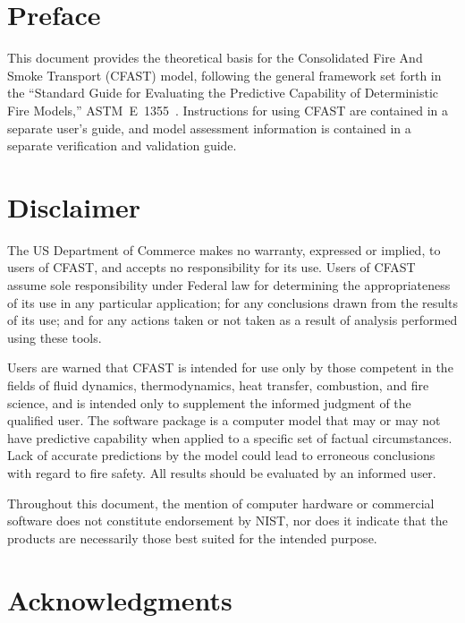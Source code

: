 \documentclass[12pt]{book}
\begin{document}
\newpage

\frontmatter

\pagestyle{plain}
\setcounter{page}{3}


\chapter{Preface}

This document provides the theoretical basis for the Consolidated Fire And Smoke Transport (CFAST) model, following the general framework set forth in the ``Standard Guide for Evaluating the Predictive Capability of Deterministic Fire Models,'' ASTM~E~1355~\cite{ASTM:E1355}. Instructions for using CFAST are contained in a separate user's guide, and model assessment information is contained in a separate verification and validation guide.

\chapter{Disclaimer}

The US Department of Commerce makes no warranty, expressed or implied, to users of CFAST, and accepts no responsibility for its use. Users of CFAST assume sole responsibility under Federal law for determining the appropriateness of its use in any particular application; for any conclusions drawn from the results of its use; and for any actions taken or not taken as a result of analysis performed using these tools.

Users are warned that CFAST is intended for use only by those competent in the fields of fluid dynamics, thermodynamics, heat transfer, combustion, and fire science, and is intended only to supplement the informed judgment of the qualified user. The software package is a computer model that may or may not have predictive capability when applied to a specific set of factual circumstances. Lack of accurate predictions by the model could lead to erroneous conclusions with regard to fire safety. All results should be evaluated by an informed user.

Throughout this document, the mention of computer hardware or commercial software does not constitute endorsement by NIST, nor does it indicate that the products are necessarily those best suited for the intended purpose.




\chapter{Acknowledgments}
\end{document}
